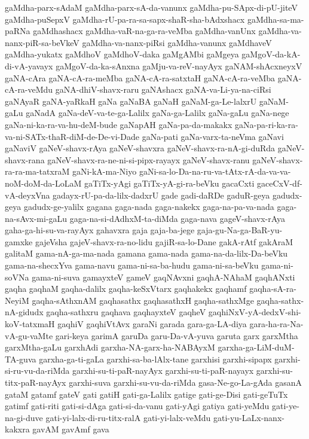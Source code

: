 {gaMdha-parx-sAdaM
gaMdha-parx-sA-da-vanunx
gaMdha-pu-SApx-di-pU-jiteV
gaMdha-puSepxV
gaMdha-rU-pa-ra-sa-sapx-shaR-sha-bAdxshacx
gaMdha-sa-ma-paRNa
gaMdhashacx
gaMdha-vaR-na-ga-ra-veMba
gaMdha-vanUnx
gaMdha-va-nanx-piR-sa-beVkeV
gaMdha-va-nanx-piRsi
gaMdha-vanunx
gaMdhaveV
gaMdha-yukatx
gaMdhoV
gaMdhoV-daka
gaMgAMbi
gaMgeya
gaMgoV-da-kA-di-vA-yavayx
gaMgoV-da-ka-sAnxna
gaMju-va-reV-nayAyx
gaNAM-shAcxneyxV
gaNA-cAra
gaNA-cA-ra-meMba
gaNA-cA-ra-satxtaH
gaNA-cA-ra-veMba
gaNA-cA-ra-veMdu
gaNA-dhiV-shavx-raru
gaNAshacx
gaNA-va-Li-ya-na-ciRsi
gaNAyaR
gaNA-yaRkaH
gaNa
gaNaBA
gaNaH
gaNaM-ga-Le-lalxrU
gaNaM-gaLu
gaNadA
gaNa-deV-va-te-ga-Lalilx
gaNa-ga-Lalilx
gaNa-gaLu
gaNa-nege
gaNa-ni-ka-ra-va-hu-deM-bude
gaNapAH
gaNa-pa-da-makakx
gaNa-pa-ri-ka-ra-va-ni-SATx-thaR-diM-de-De-vi-Dade
gaNa-pati
gaNa-varx-ta-neVma
gaNavi
gaNaviV
gaNeV-shavx-rAya
gaNeV-shavxra
gaNeV-shavx-ra-nA-gi-duRda
gaNeV-shavx-rana
gaNeV-shavx-ra-ne-ni-si-pipx-rayayx
gaNeV-shavx-ranu
gaNeV-shavx-ra-ra-ma-tatxraM
gaNi-kA-ma-Niyo
gaNi-sa-lo-Da-na-ru-va-tAtx-rA-da-va-va-noM-doM-da-LoLaM
gaTiTx-yAgi
gaTiTx-yA-gi-ra-beVku
gacaCxti
gaceCxV-df-vA-deyxVna
gadayx-rU-pa-da-lilx-dadxrU
gade
gadi-daRDe
gaduR-geya
gadudx-geya
gadudx-ge-yalilx
gagana
gaga-nada
gaga-nakekx
gaga-na-pa-va-nada
gaga-na-sAvx-mi-gaLu
gaga-na-si-dAdhxM-ta-diMda
gaga-nava
gageV-shavx-rAya
gaha-ga-hi-su-va-rayAyx
gahavxra
gaja
gaja-ba-jege
gaja-gu-Na-ga-BaR-yu-gamxke
gajeVsha
gajeV-shavx-ra-no-lidu
gajiR-sa-lo-Dane
gakA-rAtf
gakAraM
galitaM
gama-nA-ga-ma-nada
gamana
gama-nada
gama-na-da-lilx-Da-beVku
gama-na-shecxYva
gama-navu
gama-ni-sa-ba-hudu
gama-ni-sa-beVku
gama-ni-soVNa
gama-ni-suva
gamayxteV
gameV
gaqNAvxni
gaqhA-NAhaM
gaqhANxti
gaqha
gaqhaM
gaqha-dalilx
gaqha-keSxVtarx
gaqhakekx
gaqhamf
gaqha-sA-ra-NeyiM
gaqha-sAthxnAM
gaqhasathx
gaqhasathxH
gaqha-sathxMge
gaqha-sathx-nA-gidudx
gaqha-sathxru
gaqhava
gaqhayxteV
gaqheV
gaqhiNxV-yA-dedxV-shi-koV-tatxmaH
gaqhiV
gaqhiVtAvx
garaNi
garada
gara-ga-LA-diya
gara-ha-ra-Na-vA-gu-vaMte
gari-keya
garimA
garuDa
garu-Da-vA-yuva
garuta
garx
garxMtha
garxMtha-gaLu
garxhAdi
garxha-NA-garx-ha-NABAyxM
garxha-ga-LiM-duM-TA-guva
garxha-ga-ti-gaLa
garxhi-sa-ba-lAlx-tane
garxhisi
garxhi-sipapx
garxhi-si-ru-vu-da-riMda
garxhi-su-ti-paR-nayAyx
garxhi-su-ti-paR-nayayx
garxhi-su-titx-paR-nayAyx
garxhi-suva
garxhi-su-vu-da-riMda
gasa-Ne-go-La-gAda
gasanA
gataM
gatamf
gateV
gati
gatiH
gati-ga-Lalilx
gatige
gati-ge-Disi
gati-geTuTx
gatimf
gati-riti
gati-si-dAga
gati-si-da-vanu
gati-yAgi
gatiya
gati-yeMdu
gati-ye-na-gi-duve
gati-yi-lalx-di-ru-titx-ralA
gati-yi-lalx-veMdu
gati-yu-LaLx-nanx-kakxra
gavAM
gavAmf
gava
}

